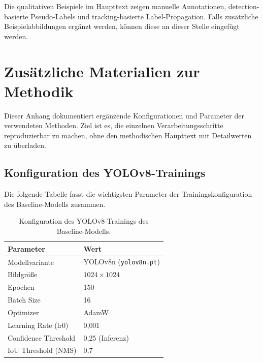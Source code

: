 Die qualitativen Beispiele im Haupttext zeigen manuelle Annotationen,
detection-basierte Pseudo-Labels und tracking-basierte Label-Propagation. Falls
zusätzliche Beispielabbildungen ergänzt werden, können diese an dieser Stelle
eingefügt werden.

%


\section{Zusätzliche Materialien zur Methodik}
\label{app:methodik}

Dieser Anhang dokumentiert ergänzende Konfigurationen und Parameter der
verwendeten Methoden. Ziel ist es, die einzelnen Verarbeitungsschritte
reproduzierbar zu machen, ohne den methodischen Haupttext mit Detailwerten zu
überladen.

\subsection{Konfiguration des YOLOv8-Trainings}

Die folgende Tabelle fasst die wichtigsten Parameter der Trainingskonfiguration
des Baseline-Modells zusammen.

\begin{table}[H]
    \centering
    \caption{Konfiguration des YOLOv8-Trainings des Baseline-Modells.}
    \label{tab:anhang_yolo_config}
    \begin{tabular}{ll}
        \toprule
        \textbf{Parameter}   & \textbf{Wert}                 \\
        \midrule
        Modellvariante       & YOLOv8n (\texttt{yolov8n.pt}) \\
        Bildgröße            & $1024 \times 1024$            \\
        Epochen              & 150                           \\
        Batch Size           & 16                            \\
        Optimizer            & AdamW                         \\
        Learning Rate (lr0)  & 0{,}001                       \\
        Confidence Threshold & 0{,}25 (Inferenz)             \\
        IoU Threshold (NMS)  & 0{,}7                         \\
        \bottomrule
    \end{tabular}
\end{table}

